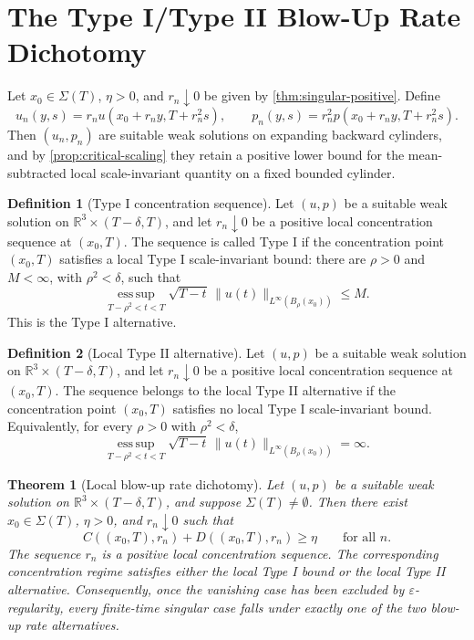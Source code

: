 \documentclass[11pt]{amsart}
\theoremstyle{plain}
\newtheorem{theorem}{Theorem}[section]
\theoremstyle{definition}
\newtheorem{definition}[definition]{Definition}
\theoremstyle{remark}
\begin{document}
\section{The Type I/Type II Blow-Up Rate Dichotomy}

Let \(x_0\in\Sigma(T)\), \(\eta>0\), and \(r_n\downarrow0\) be given by
\cref{thm:singular-positive}.  Define
\[
  u_n(y,s)=r_nu(x_0+r_ny,T+r_n^2s),
  \qquad
  p_n(y,s)=r_n^2p(x_0+r_ny,T+r_n^2s).
\]
Then \((u_n,p_n)\) are suitable weak solutions on expanding backward
cylinders, and by \cref{prop:critical-scaling} they retain a positive lower
bound for the mean-subtracted local scale-invariant quantity on a fixed
bounded cylinder.

\begin{definition}[Type I concentration sequence]
\label{def:typeI-concentration}
Let \((u,p)\) be a suitable weak solution on
\(\mathbb R^3\times(T-\delta,T)\), and let \(r_n\downarrow0\) be a positive
local concentration sequence at \((x_0,T)\).  The sequence is called Type I
if the concentration point \((x_0,T)\) satisfies a local Type I
scale-invariant bound:
there are \(\rho>0\) and \(M<\infty\), with \(\rho^2<\delta\), such that
\[
  \operatorname*{ess\,sup}_{T-\rho^2<t<T}
  \sqrt{T-t}\,\|u(t)\|_{L^\infty(B_\rho(x_0))}\le M.
\]
This is the Type I alternative.
\end{definition}

\begin{definition}[Local Type II alternative]
\label{def:typeII-alternative}
Let \((u,p)\) be a suitable weak solution on
\(\mathbb R^3\times(T-\delta,T)\), and let \(r_n\downarrow0\) be a positive
local concentration sequence at \((x_0,T)\).  The sequence belongs to the local
Type II alternative if the concentration point \((x_0,T)\) satisfies no
local Type I scale-invariant bound.  Equivalently, for every \(\rho>0\) with
\(\rho^2<\delta\),
\[
  \operatorname*{ess\,sup}_{T-\rho^2<t<T}
  \sqrt{T-t}\,\|u(t)\|_{L^\infty(B_\rho(x_0))}=\infty.
\]
\end{definition}

\begin{theorem}[Local blow-up rate dichotomy]\label{thm:typeI-typeII-dichotomy}
Let \((u,p)\) be a suitable weak solution on
\(\mathbb R^3\times(T-\delta,T)\), and suppose \(\Sigma(T)\ne\emptyset\).
Then there exist \(x_0\in\Sigma(T)\),
\(\eta>0\), and \(r_n\downarrow0\) such that
\[
  C((x_0,T),r_n)+D((x_0,T),r_n)\ge\eta
  \qquad\text{for all }n.
\]
The sequence \(r_n\) is a positive local concentration sequence.  The
corresponding concentration regime satisfies either the local Type I bound or
the local Type II alternative.  Consequently, once the vanishing case has been
excluded by \(\varepsilon\)-regularity, every finite-time singular case falls
under exactly one of the two blow-up rate alternatives.
\end{theorem}
\end{document}
